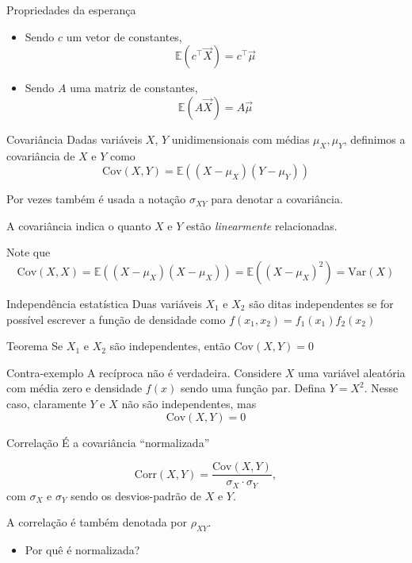 \documentclass[
  ignorenonframetext,
  aspectratio=169,
]{beamer}
\newcommand{\EE}{\mathbb{E}}
\newcommand{\vX}{\vec{X}}
\newcommand{\vmu}{\vec{\mu}}
\begin{document}
\begin{frame}{Propriedades da esperança} 

\begin{itemize}
  \item Sendo $c$ um vetor de constantes, 
\[\EE(c^\top \vX) = c^\top\vmu\]
  \item Sendo $A$ uma matriz de constantes,
   \[\EE(A\vX) = A\vmu\]
\end{itemize}

\end{frame}

\begin{frame}{Covariância}
Dadas variáveis \(X\), \(Y\) unidimensionais com médias
\(\mu_X, \mu_Y\), definimos a covariância de \(X\) e \(Y\) como
\[\text{Cov}(X,Y) = \EE( (X - \mu_X)(Y - \mu_Y))\]

Por vezes também é usada a notação \(\sigma_{XY}\) para denotar a
covariância.

A covariância indica o quanto \(X\) e \(Y\) estão \emph{linearmente}
relacionadas.
\end{frame}

\begin{frame}
Note que
\[\text{Cov}(X,X) = \EE( (X - \mu_X)(X - \mu_X)) =  \EE((X-\mu_X)^2) =  \text{Var}(X)\]
\end{frame}

\begin{frame}{Independência estatística}
Duas variáveis \(X_1\) e \(X_2\) são ditas independentes se for possível
escrever a função de densidade como \(f(x_1,x_2) = f_1(x_1)f_2(x_2)\)

\begin{block}{Teorema}
Se \(X_1\) e \(X_2\) são independentes, então \(\text{Cov}(X,Y)=0\)
\end{block}
\end{frame}

\begin{frame}
\begin{block}{Contra-exemplo}
A recíproca não é verdadeira. Considere \(X\) uma variável aleatória com
média zero e densidade \(f(x)\) sendo uma função par. Defina
\(Y = X^2\). Nesse caso, claramente \(Y\) e \(X\) não são independentes,
mas \[\text{Cov}(X,Y) = 0 \]
\end{block}
\end{frame}

\begin{frame}{Correlação}
É a covariância ``normalizada''

\[\text{Corr}(X,Y) = \frac{\text{Cov}(X,Y)}{\sigma_X\cdot\sigma_Y},\]
com \(\sigma_X\) e \(\sigma_Y\) sendo os desvios-padrão de \(X\) e \(Y\). 

A correlação é também denotada por \(\rho_{XY}\).

\begin{itemize}
  \item Por quê é normalizada?
\end{itemize}
\end{frame}
\end{document}
